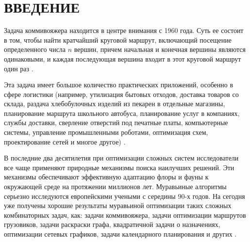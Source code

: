 {\centering \chapter*{ВВЕДЕНИЕ}}

Задача коммивояжера находится в центре внимания с 1960 года. 
Суть ее состоит в том, чтобы найти кратчайший круговой маршрут, включающий посещение определенного числа $n$ вершин, причем начальная и конечная вершины являются одинаковыми, и каждая последующая вершина входит в этот круговой маршрут один раз \cite{Brezina2020}. 

Эта задача имеет большое количество практических приложений, особенно в сфере логистики (например, утилизация бытовых отходов, доставка товаров со склада, раздача хлебобулочных изделий из пекарен в отдельные магазины, планирование маршрута школьного автобуса, планирование услуг в компаниях, службы доставки, сверление отверстий под печатные платы, компьютерные системы, управление промышленными роботами, оптимизация схем, проектирование сетей и многое другое) \cite{Brezina2020}.

В последние два десятилетия при оптимизации сложных систем исследователи все чаще применяют природные механизмы поиска наилучших решений. 
Эти механизмы обеспечивают эффективную адаптацию флоры и фауны к окружающей среде на протяжении миллионов лет. 
Муравьиные алгоритмы серьезно исследуются европейскими учеными с середины 90-х годов. 
На сегодня уже получены хорошие результаты муравьиной оптимизации таких сложных комбинаторных задач, как: задачи коммивояжера, задачи оптимизации маршрутов грузовиков, задачи раскраски графа, квадратичной задачи о назначениях, оптимизации сетевых графиков, задачи календарного планирования и других \cite{Shtovba2003}. 